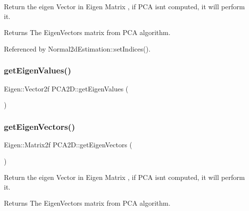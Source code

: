 Return the eigen Vector in Eigen Matrix , if P\+CA isn\textquotesingle{}t computed, it will perform it. 

\begin{DoxyReturn}{Returns}
The Eigen\+Vectors matrix from P\+CA algorithm. 
\end{DoxyReturn}


Referenced by Normal2d\+Estimation\+::set\+Indices().

\mbox{\label{classPCA2D_ace26902adea167c5aef9a3219ceafbd3}} 
\subsubsection{\texorpdfstring{get\+Eigen\+Values()}{getEigenValues()}\hspace{0.1cm}{\footnotesize\ttfamily [2/2]}}
{\footnotesize\ttfamily Eigen\+::\+Vector2f P\+C\+A2\+D\+::get\+Eigen\+Values (\begin{DoxyParamCaption}{ }\end{DoxyParamCaption})\hspace{0.3cm}{\ttfamily [inline]}}

\mbox{\label{classPCA2D_a2243f1d03a734f7cf4f9f959f494a2e0}} 
\subsubsection{\texorpdfstring{get\+Eigen\+Vectors()}{getEigenVectors()}\hspace{0.1cm}{\footnotesize\ttfamily [1/2]}}
{\footnotesize\ttfamily Eigen\+::\+Matrix2f P\+C\+A2\+D\+::get\+Eigen\+Vectors (\begin{DoxyParamCaption}{ }\end{DoxyParamCaption})\hspace{0.3cm}{\ttfamily [inline]}}



Return the eigen Vector in Eigen Matrix , if P\+CA isn\textquotesingle{}t computed, it will perform it. 

\begin{DoxyReturn}{Returns}
The Eigen\+Vectors matrix from P\+CA algorithm. 
\end{DoxyReturn}


